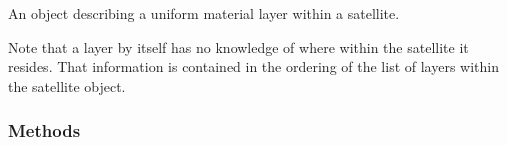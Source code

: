 An object describing a uniform material layer within a satellite.

Note that a layer by itself has no knowledge of where within the satellite 
it resides.  That information is contained in the ordering of the list of 
layers within the satellite object.



  \subsubsection{Methods}

    \vspace{0.5ex}

